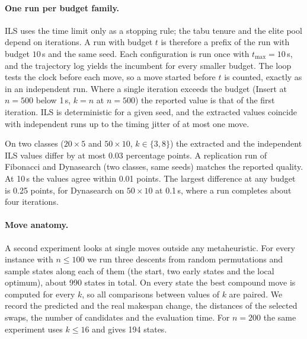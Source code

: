 \documentclass[letterpaper]{article} %
\theoremstyle{definition}
\begin{document}
\paragraph{One run per budget family.} ILS uses the time limit only as a
stopping rule; the tabu tenure and the elite pool depend on iterations. A run
with budget $t$ is therefore a prefix of the run with budget $10$\,s and
the same seed. Each configuration is run once with $t_{\max}=10$\,s, and
the trajectory log yields the incumbent for every smaller budget. The
loop tests the clock before each move, so a move started before $t$ is
counted, exactly as in an independent run. Where a single iteration
exceeds the budget (Insert at $n=500$ below 1\,s, $k=n$ at $n=500$) the
reported value is that of the first iteration. ILS is deterministic for a
given seed, and the extracted values coincide with independent runs up to
the timing jitter of at most one move.

On two classes ($20\times 5$ and $50\times 10$,
$k\in\{3,8\}$) the extracted and the independent ILS values differ by at
most 0.03 percentage points. A replication run of Fibonacci and Dynasearch (two classes, same seeds)
matches the reported quality.
At 10\,s the values agree within 0.01 points. The largest difference at
any budget is 0.25 points, for Dynasearch on $50\times 10$ at 0.1\,s,
where a run completes about four iterations.

\paragraph{Move anatomy.} A second experiment looks at single moves
outside any metaheuristic. For every instance with $n\leq 100$ we run
three descents from random permutations and sample states along each of
them (the start, two early states and the local optimum), about 990
states in total. On every state the best compound move is computed for
every $k$, so all comparisons between values of $k$ are paired. We record
the predicted and the real makespan change, the distances of the selected
swaps, the number of candidates and the evaluation time.
For $n=200$ the same experiment uses $k\leq 16$ and gives 194 states.
\end{document}
